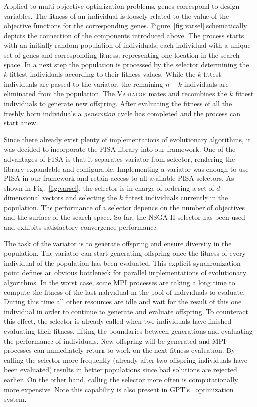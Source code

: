 \documentclass[preprint,linenumbers,amsmath,amssymb,aps,prstab]{revtex4-1}%
\begin{document}
Applied to multi-objective optimization problems, genes correspond to
  design variables.
The fitness of an individual is loosely related to the value of the objective
  functions for the corresponding genes.
Figure~\ref{fig:varsel} schematically depicts the connection of the
  components introduced above.
The process starts with an initially random population of individuals, each
  individual with a unique set of genes and corresponding fitness,
  representing one location in the search space.
In a next step the population is processed by the selector
  determining the $k$ fittest individuals according to their fitness values.
While the $k$ fittest individuals are passed to the variator, the
  remaining $n-k$ individuals are eliminated from the population.
The \textsc{Variator} mates and recombines the $k$ fittest individuals to
  generate new offspring.
After evaluating the fitness of all the freshly born individuals a
  \textit{generation} cycle has completed and the process can start anew.

Since there already exist plenty of implementations of evolutionary algorithms,
  it was decided to incorporate the PISA library \cite{pisa} into our
  framework.
One of the advantages of PISA is that it separates variator from selector,
  rendering the library expandable and configurable.
Implementing a variator was enough to use PISA in our framework and
  retain access to all available PISA selectors.
As shown in Fig.~\ref{fig:varsel}, the selector is in charge of ordering a
  set of $d$-dimensional vectors and selecting the $k$ fittest individuals
  currently in the population.
The performance of a selector depends on the number of objectives and the
  surface of the search space.
So far, the NSGA-II selector \cite{dpam:02} has been used and exhibits satisfactory
  convergence performance.

The task of the variator is to generate offspring and ensure diversity in the
  population.
The variator can start generating offspring once the fitness of every
  individual of the population has been evaluated.
This explicit synchronization point defines an obvious bottleneck for parallel
  implementations of evolutionary algorithms.
In the worst case, some MPI processes are taking a long time to compute the
  fitness of the last individual in the pool of individuals to evaluate.
During this time all other resources are idle and wait for the result of
  this one individual in order to continue to generate and evaluate offspring.
To counteract this effect, the selector is already called when two individuals
  have finished evaluating their fitness, lifting the boundaries between
  generations and evaluating the performance of individuals.
New offspring will be generated and MPI processes can immediately return to
  work on the next fitness evaluation.
By calling the selector more frequently (already after two offspring
  individuals have been evaluated) results in better populations since bad
  solutions are rejected earlier.
On the other hand, calling the selector more often is computationally more
  expensive. Note this capability is also present in GPT's~\cite{gpt} optimization system. 
\end{document}
